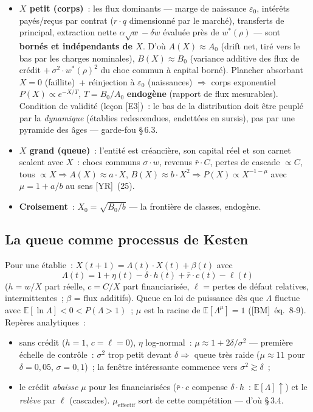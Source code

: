 \documentclass[11pt,a4paper]{article}
\begin{document}
\begin{itemize}
  \item \textbf{$X$ petit (corps)}~: les flux dominants --- marge de naissance $\varepsilon_0$, intérêts payés/reçus par contrat ($r\cdot q$ dimensionné par le marché), transferts de principal, extraction nette $\alpha\sqrt{w}-\delta w$ évaluée près de $w^*(\rho)$ --- sont \textbf{bornés et indépendants de $X$}. D'où $A(X)\approx A_0$ (drift net, tiré vers le bas par les charges nominales), $B(X)\approx B_0$ (variance additive des flux de crédit $+\ \sigma^2\cdot w^*(\rho)^2$ du choc commun à capital borné). Plancher absorbant $X=0$ (faillite)~+ réinjection à $\varepsilon_0$ (naissances) $\Rightarrow$ corps exponentiel $P(X)\propto e^{-X/T}$, $T=B_0/A_0$ \textbf{endogène} (rapport de flux mesurables). Condition de validité (leçon [E3])~: le bas de la distribution doit être peuplé par la \emph{dynamique} (établies redescendues, endettées en sursis), pas par une pyramide des âges --- garde-fou \S\,6.3.
  \item \textbf{$X$ grand (queue)}~: l'entité est créancière, son capital réel et son carnet scalent avec $X$~: chocs communs $\sigma\cdot w$, revenus $\bar r\cdot C$, pertes de cascade $\propto C$, tous $\propto X \Rightarrow A(X)\approx a\cdot X$, $B(X)\approx b\cdot X^2 \Rightarrow P(X)\propto X^{-1-\mu}$ avec $\mu = 1+a/b$ au sens [YR]~(25).
  \item \textbf{Croisement}~: $X_0=\sqrt{B_0/b}$ --- la frontière de classes, endogène.
\end{itemize}

\subsection{La queue comme processus de Kesten}
\label{sec:kesten}

Pour une établie~: $X(t+1) = \Lambda(t)\cdot X(t) + \beta(t)$ avec
\[
  \Lambda(t) = 1 + \eta(t) - \delta\cdot h(t) + \bar r\cdot c(t) - \ell(t)
\]
($h=w/X$ part réelle, $c=C/X$ part financiarisée, $\ell$ = pertes de défaut relatives, intermittentes~; $\beta$ = flux additifs). Queue en loi de puissance dès que $\Lambda$ fluctue avec $\mathbb E[\ln\Lambda] < 0 < P(\Lambda>1)$~; $\mu$ est la racine de $\mathbb E[\Lambda^\mu]=1$ ([BM]~éq.~8-9). Repères analytiques~:

\begin{itemize}
  \item sans crédit ($h=1$, $c=\ell=0$), $\eta$ log-normal~: $\mu \approx 1+2\delta/\sigma^2$ --- première échelle de contrôle~: $\sigma^2$ trop petit devant $\delta \Rightarrow$ queue très raide ($\mu\approx 11$ pour $\delta=0{,}05$, $\sigma=0{,}1$)~; la fenêtre intéressante commence vers $\sigma^2 \gtrsim \delta$~;
  \item le crédit \emph{abaisse} $\mu$ pour les financiarisées ($\bar r\cdot c$ compense $\delta\cdot h$~: $\mathbb E[\Lambda]\uparrow$) et le \emph{relève} par $\ell$ (cascades). $\mu_{\mathrm{effectif}}$ sort de cette compétition --- d'où \S\,3.4.
\end{itemize}
\end{document}
